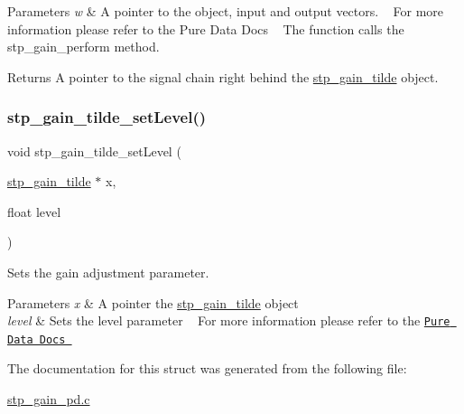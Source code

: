 \begin{DoxyParams}{Parameters}
{\em w} & A pointer to the object, input and output vectors. ~\newline
 For more information please refer to the Pure Data Docs ~\newline
 The function calls the stp\+\_\+gain\+\_\+perform method. ~\newline
 \\
\hline
\end{DoxyParams}
\begin{DoxyReturn}{Returns}
A pointer to the signal chain right behind the \hyperlink{structstp__gain__tilde}{stp\+\_\+gain\+\_\+tilde} object. ~\newline
 
\end{DoxyReturn}
\mbox{\label{structstp__gain__tilde_a724fa7ba5f9d719d188b109f207c7f9b}} 
\subsubsection{\texorpdfstring{stp\+\_\+gain\+\_\+tilde\+\_\+set\+Level()}{stp\_gain\_tilde\_setLevel()}}
{\footnotesize\ttfamily void stp\+\_\+gain\+\_\+tilde\+\_\+set\+Level (\begin{DoxyParamCaption}\item[{\hyperlink{structstp__gain__tilde}{stp\+\_\+gain\+\_\+tilde} $\ast$}]{x,  }\item[{float}]{level }\end{DoxyParamCaption})\hspace{0.3cm}{\ttfamily [related]}}



Sets the gain adjustment parameter. ~\newline
 


\begin{DoxyParams}{Parameters}
{\em x} & A pointer the \hyperlink{structstp__gain__tilde}{stp\+\_\+gain\+\_\+tilde} object ~\newline
 \\
\hline
{\em level} & Sets the level parameter ~\newline
 For more information please refer to the \href{https://github.com/pure-data/externals-howto}{\tt Pure Data Docs } ~\newline
 \\
\hline
\end{DoxyParams}


The documentation for this struct was generated from the following file\+:\begin{DoxyCompactItemize}
\item 
\hyperlink{stp__gain__pd_8c}{stp\+\_\+gain\+\_\+pd.\+c}\end{DoxyCompactItemize}
